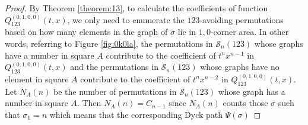 \documentclass[
final,nomarks
]{dmtcs-episciences}
\newcommand{\tref}[1]{Theorem \ref{theorem:#1}}
\newcommand{\fref}[1]{Figure \ref{fig:#1}}
\newcommand{\Sn}[1]{\mathcal{S}_{#1}}
\newcommand{\Qm}[1]{Q_{123}^{(#1)}(t,x)}
\begin{document}
\begin{proof}
	By  \tref{13}, to calculate the coefficients of function \begin{math}\Qm{0,1,0,0}\end{math}, we only need to enumerate the 
	\begin{math}123\end{math}-avoiding permutations based on how many elements in the graph of \begin{math}\sigma\end{math} lie in 
	\begin{math}1,0\end{math}-corner area. In other words, referring to \fref{0k0la}, the permutations in \begin{math}\Sn{n}(123)\end{math} whose graphs have a number in square  \begin{math}A\end{math} contribute to the coefficient of \begin{math}t^n x^{n-1}\end{math} in \begin{math}\Qm{0,1,0,0}\end{math} and the permutations in \begin{math}\Sn{n}(123)\end{math} whose graphs have no element in square \begin{math}A\end{math} contribute to the coefficient of \begin{math}t^n x^{n-2}\end{math} in \begin{math}\Qm{0,1,0,0}\end{math}. Let  \begin{math}N_A(n)\end{math} be the number of permutations in \begin{math}\Sn{n}(123)\end{math} whose graph has a number  in square  \begin{math}A\end{math}. Then \begin{math}N_A(n)=C_{n-1}\end{math} since \begin{math}N_A(n)\end{math} counts those 
	\begin{math}\sigma\end{math} such that \begin{math}\sigma_1 =n\end{math} which means that the corresponding Dyck path \begin{math}\Psi(\sigma)\end{math} 

\end{proof}
\end{document}
